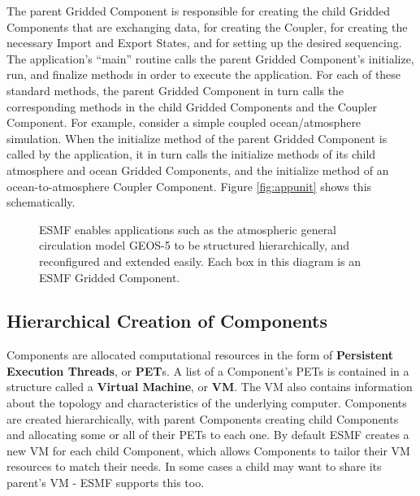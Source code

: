 The parent Gridded Component is responsible for creating the child 
Gridded Components that are exchanging data, for creating the Coupler, 
for creating the necessary Import and Export States, and for 
setting up the desired sequencing.  The application's ``main'' routine
calls the parent Gridded Component's initialize, run, and finalize 
methods in order to execute the application.  For each of these
standard methods, the parent Gridded Component in turn calls the 
corresponding methods in the child Gridded Components and the 
Coupler Component.  For example, consider a simple coupled 
ocean/atmosphere simulation.  When the initialize method of the 
parent Gridded Component is called by the application, it in turn 
calls the initialize methods of its child atmosphere and ocean 
Gridded Components, and the initialize method of an 
ocean-to-atmosphere Coupler Component.  Figure \ref{fig:appunit}
shows this schematically.

\begin{center}
\begin{figure}
\caption{ESMF enables applications such as the atmospheric general
circulation model GEOS-5 to be structured hierarchically, and 
reconfigured and extended easily.  Each box in this diagram is an
ESMF Gridded Component.}
\label{fig:GEOS5}
\end{figure}
\end{center}

\subsection{Hierarchical Creation of Components}
\label{sec:hierarchy}

Components are allocated computational resources in the form of
{\bf Persistent Execution Threads}, or {\bf PET}s.  A list of a Component's
PETs is contained in a structure called a {\bf Virtual Machine},
or {\bf VM}.  The VM also contains information about the topology and
characteristics of the underlying computer.
Components are created hierarchically, with parent Components creating
child Components and allocating some or all of their PETs to each one.
By default ESMF creates a new VM for each child Component, which 
allows Components to tailor their VM resources to match their needs.
In some cases a child may want to share its parent's VM - ESMF
supports this too.

